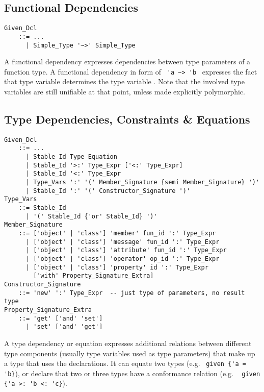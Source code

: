 \subsection{Functional Dependencies}

\grammar\begin{lstlisting}
Given_Dcl 
    ::= ...
      | Simple_Type '~>' Simple_Type
\end{lstlisting}

A functional dependency expresses dependencies between type parameters of a function type. A functional dependency in form of ~\lstinline!'a ~> 'b!~ expresses the fact that type variable  determines the type variable . Note that the involved type variables are still unifiable at that point, unless made explicitly polymorphic. 





\subsection{Type Dependencies, Constraints \& Equations}

\grammar\begin{lstlisting}
Given_Dcl 
    ::= ...
      | Stable_Id Type_Equation
      | Stable_Id '>:' Type_Expr ['<:' Type_Expr]
      | Stable_Id '<:' Type_Expr
      | Type_Vars ':' '(' Member_Signature {semi Member_Signature} ')'
      | Stable_Id ':' '(' Constructor_Signature ')'
Type_Vars 
    ::= Stable_Id
      | '(' Stable_Id {'or' Stable_Id} ')'
Member_Signature
    ::= ['object' | 'class'] 'member' fun_id ':' Type_Expr
      | ['object' | 'class'] 'message' fun_id ':' Type_Expr
      | ['object' | 'class'] 'attribute' fun_id ':' Type_Expr
      | ['object' | 'class'] 'operator' op_id ':' Type_Expr
      | ['object' | 'class'] 'property' id ':' Type_Expr 
        ['with' Property_Signature_Extra]
Constructor_Signature
    ::= 'new' ':' Type_Expr  -- just type of parameters, no result type
Property_Signature_Extra
    ::= 'get' ['and' 'set']
      | 'set' ['and' 'get']
\end{lstlisting}

A type dependency or equation expresses additional relations between different type components (usually type variables used as type parameters) that make up a type that uses the  declarations. It can equate two types (e.g. ~\lstinline!given {'a = 'b}!), or declare that two or three types have a conformance relation (e.g. ~ \lstinline!given {'a >: 'b <: 'c}!).





